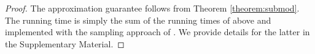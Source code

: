 \begin{proof}
The approximation guarantee follows from Theorem \ref{theorem:submod}. The running time is simply the sum of the running times of \algomaxst{} above and  \algosubmod{} implemented with the sampling approach of \cite{borgs:soda14}. We provide details for the latter in the Supplementary Material.
\end{proof}


